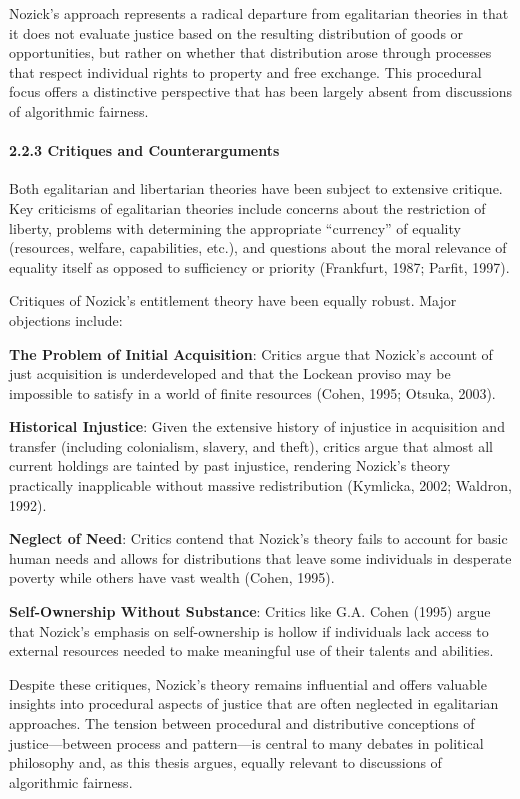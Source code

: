 Nozick's approach represents a radical departure from egalitarian
theories in that it does not evaluate justice based on the resulting
distribution of goods or opportunities, but rather on whether that
distribution arose through processes that respect individual rights to
property and free exchange. This procedural focus offers a distinctive
perspective that has been largely absent from discussions of algorithmic
fairness.

\paragraph{2.2.3 Critiques and
Counterarguments}\label{critiques-and-counterarguments}

Both egalitarian and libertarian theories have been subject to extensive
critique. Key criticisms of egalitarian theories include concerns about
the restriction of liberty, problems with determining the appropriate
``currency'' of equality (resources, welfare, capabilities, etc.), and
questions about the moral relevance of equality itself as opposed to
sufficiency or priority (Frankfurt, 1987; Parfit, 1997).

Critiques of Nozick's entitlement theory have been equally robust. Major
objections include:

\textbf{The Problem of Initial Acquisition}: Critics argue that Nozick's
account of just acquisition is underdeveloped and that the Lockean
proviso may be impossible to satisfy in a world of finite resources
(Cohen, 1995; Otsuka, 2003).

\textbf{Historical Injustice}: Given the extensive history of injustice
in acquisition and transfer (including colonialism, slavery, and theft),
critics argue that almost all current holdings are tainted by past
injustice, rendering Nozick's theory practically inapplicable without
massive redistribution (Kymlicka, 2002; Waldron, 1992).

\textbf{Neglect of Need}: Critics contend that Nozick's theory fails to
account for basic human needs and allows for distributions that leave
some individuals in desperate poverty while others have vast wealth
(Cohen, 1995).

\textbf{Self-Ownership Without Substance}: Critics like G.A. Cohen
(1995) argue that Nozick's emphasis on self-ownership is hollow if
individuals lack access to external resources needed to make meaningful
use of their talents and abilities.

Despite these critiques, Nozick's theory remains influential and offers
valuable insights into procedural aspects of justice that are often
neglected in egalitarian approaches. The tension between procedural and
distributive conceptions of justice---between process and pattern---is
central to many debates in political philosophy and, as this thesis
argues, equally relevant to discussions of algorithmic fairness.

